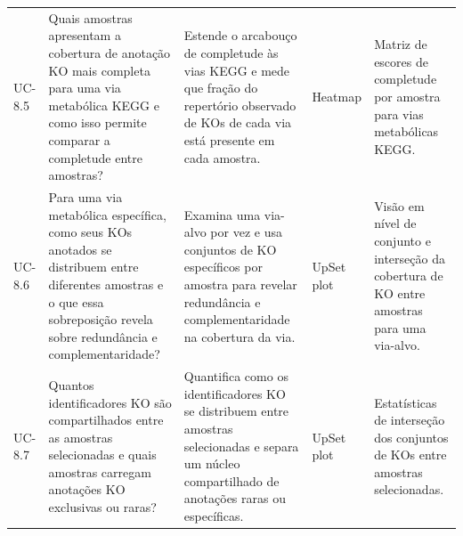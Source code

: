 \begin{landscape}
\begin{longtable}{>{\raggedright\arraybackslash}p{1.1cm} >{\raggedright\arraybackslash}p{5.0cm} >{\raggedright\arraybackslash}p{7.8cm} >{\raggedright\arraybackslash}p{4.2cm} >{\raggedright\arraybackslash}p{5.3cm}}
UC-8.5 & Quais amostras apresentam a cobertura de anotação KO mais completa para uma via metabólica KEGG e como isso permite comparar a completude entre amostras? & Estende o arcabouço de completude às vias KEGG e mede que fração do repertório observado de KOs de cada via está presente em cada amostra. & Heatmap & Matriz de escores de completude por amostra para vias metabólicas KEGG. \\
UC-8.6 & Para uma via metabólica específica, como seus KOs anotados se distribuem entre diferentes amostras e o que essa sobreposição revela sobre redundância e complementaridade? & Examina uma via-alvo por vez e usa conjuntos de KO específicos por amostra para revelar redundância e complementaridade na cobertura da via. & UpSet plot & Visão em nível de conjunto e interseção da cobertura de KO entre amostras para uma via-alvo. \\
UC-8.7 & Quantos identificadores KO são compartilhados entre as amostras selecionadas e quais amostras carregam anotações KO exclusivas ou raras? & Quantifica como os identificadores KO se distribuem entre amostras selecionadas e separa um núcleo compartilhado de anotações raras ou específicas. & UpSet plot & Estatísticas de interseção dos conjuntos de KOs entre amostras selecionadas. \\
\end{longtable}
\end{landscape}
\clearpage
